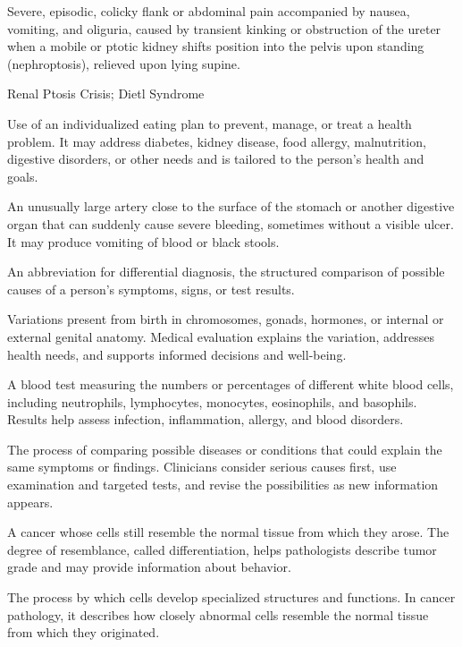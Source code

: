  Severe, episodic, colicky flank or abdominal pain accompanied by nausea, vomiting, and oliguria, caused by transient kinking or obstruction of the ureter when a mobile or ptotic kidney shifts position into the pelvis upon standing (nephroptosis), relieved upon lying supine.

\synonyms
Renal Ptosis Crisis; Dietl Syndrome

 Use of an individualized eating plan to prevent, manage, or treat a health problem. It may address diabetes, kidney disease, food allergy, malnutrition, digestive disorders, or other needs and is tailored to the person's health and goals.

 An unusually large artery close to the surface of the stomach or another digestive organ that can suddenly cause severe bleeding, sometimes without a visible ulcer. It may produce vomiting of blood or black stools.

 An abbreviation for differential diagnosis, the structured comparison of possible causes of a person’s symptoms, signs, or test results.

 Variations present from birth in chromosomes, gonads, hormones, or internal or external genital anatomy. Medical evaluation explains the variation, addresses health needs, and supports informed decisions and well-being.

 A blood test measuring the numbers or percentages of different white blood cells, including neutrophils, lymphocytes, monocytes, eosinophils, and basophils. Results help assess infection, inflammation, allergy, and blood disorders.

 The process of comparing possible diseases or conditions that could explain the same symptoms or findings. Clinicians consider serious causes first, use examination and targeted tests, and revise the possibilities as new information appears.

 A cancer whose cells still resemble the normal tissue from which they arose. The degree of resemblance, called differentiation, helps pathologists describe tumor grade and may provide information about behavior.

 The process by which cells develop specialized structures and functions. In cancer pathology, it describes how closely abnormal cells resemble the normal tissue from which they originated.

